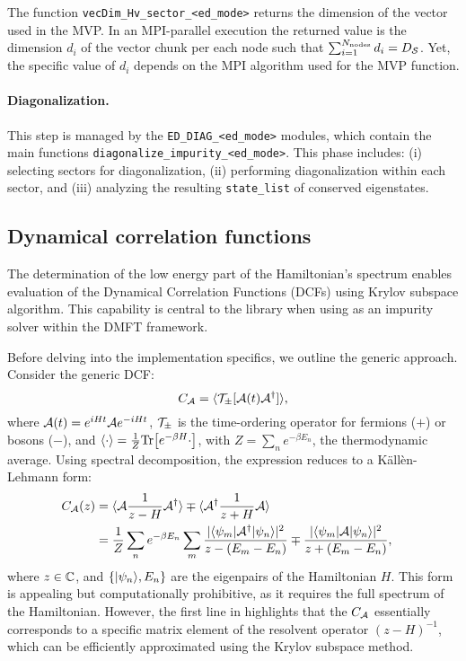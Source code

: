 \documentclass[edipack_sp.tex]{subfiles}
\begin{document}
The function {\tt vecDim\_Hv\_sector\_<ed\_mode>} returns the 
dimension of the vector used in the
MVP. In an MPI-parallel execution the returned value is the
dimension $d_i$ of the vector chunk per each node such that
$\sum_{i=1}^{N_\mathrm{nodes}}d_i = D_\SS$. Yet, the specific value of $d_i$
depends on the MPI algorithm used for the MVP function.

\paragraph{\bf Diagonalization.}
This step is managed by the {\tt ED\_DIAG\_<ed\_mode>}
modules, which contain the main functions {\tt diagonalize\_impurity\_<ed\_mode>}.
This phase includes: (i) selecting sectors for diagonalization, (ii)
performing diagonalization within each sector, and (iii) analyzing
the resulting {\tt state\_list} of conserved eigenstates.




\subsection{Dynamical correlation functions}\label{sSecGF}
The determination of the low energy part of the Hamiltonian's spectrum
enables evaluation of the Dynamical Correlation Functions (DCFs) using Krylov subspace algorithm.
This capability is central to the library when using \NAME as an
impurity solver within the DMFT framework.

Before delving into the implementation specifics, we outline the
generic approach. Consider the generic DCF:
\begin{equation}
  \label{eqGaa}
  C_\AA = \ibra \TT_\pm[ \AA(t) \AA^\dagger ]\iket,
\end{equation}
where $\AA(t)=e^{iHt}\AA e^{-iHt}$, $\TT_\pm$ is the time-ordering
operator for fermions ($+$) or
bosons ($-$), and $\ibra \cdot \iket=\frac{1}{Z}\Tr{ \left[ e^{-\beta
      H}\cdot \right]}$, with $Z=\sum_ne^{-\beta E_n}$, the thermodynamic
average.
Using spectral decomposition, the expression  reduces to a
K\"all\`en-Lehmann form:
\begin{equation}\label{KLgf}
  \begin{split}
    C_\AA(z) 
    &=  \ibra \AA \frac{1}{z-H} \AA^\dagger\iket
    \mp \ibra \AA^\dagger \frac{1}{z+H} \AA\iket \cr
    & =\frac{1}{Z}\sum_n e^{-\beta E_n}\sum_m
  \frac{ |\bra{\psi_m}\AA^\dagger \ket{\psi_n}|^2 }  {z-(E_m-E_n)}
  \mp
  \frac{ |\bra{\psi_m}\AA \ket{\psi_n}|^2 }  {z+(E_m-E_n)},\cr
\end{split}
\end{equation}
where $z\in\CCC$, and $\{\ket{\psi_n}, E_n\}$ are the eigenpairs of the
Hamiltonian $H$. 
This form is appealing but computationally prohibitive, as it requires
the full spectrum of the Hamiltonian. However, the first line in 
highlights that the $C_\AA$ essentially corresponds to a specific
matrix element of the resolvent operator $(z-H)^{-1}$, which can be
efficiently approximated using the Krylov subspace method.
\end{document}
